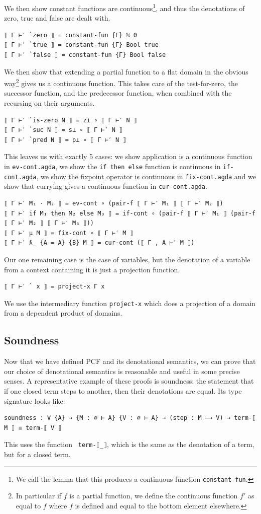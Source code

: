 \documentclass[12pt,a4paper,twoside,openright]{report}
\begin{document}
We then show constant functions are continuous\footnote{We call the lemma that this produces a continuous function \texttt{constant-fun}.}, and thus the denotations of zero, true and false are dealt with. 
\begin{verbatim}
⟦ Γ ⊢′ `zero ⟧ = constant-fun {Γ} ℕ 0
⟦ Γ ⊢′ `true ⟧ = constant-fun {Γ} Bool true
⟦ Γ ⊢′ `false ⟧ = constant-fun {Γ} Bool false
\end{verbatim}
We then show that extending a partial function to a flat domain in the obvious way\footnote{In particular if $f$ is a partial function, we define the continuous function $f'$ as equal to $f$ where $f$ is defined and equal to the bottom element elsewhere.} gives us a continuous function. This takes care of the test-for-zero, the successor function, and the predecessor function, when combined with the recursing on their arguments. 
\begin{verbatim}
⟦ Γ ⊢′ `is-zero N ⟧ = z⊥ ∘ ⟦ Γ ⊢′ N ⟧
⟦ Γ ⊢′ `suc N ⟧ = s⊥ ∘ ⟦ Γ ⊢′ N ⟧
⟦ Γ ⊢′ `pred N ⟧ = p⊥ ∘ ⟦ Γ ⊢′ N ⟧
\end{verbatim}
This leaves us with exactly 5 cases: we show application is a continuous function in \texttt{ev-cont.agda}, we show the \texttt{if then else} function is continuous in \texttt{if-cont.agda}, we show the fixpoint operator is continuous in \texttt{fix-cont.agda} and we show that currying gives a continuous function in \texttt{cur-cont.agda}.
\begin{verbatim}
⟦ Γ ⊢′ M₁ · M₂ ⟧ = ev-cont ∘ (pair-f ⟦ Γ ⊢′ M₁ ⟧ ⟦ Γ ⊢′ M₂ ⟧) 
⟦ Γ ⊢′ if M₁ then M₂ else M₃ ⟧ = if-cont ∘ (pair-f ⟦ Γ ⊢′ M₁ ⟧ (pair-f ⟦ Γ ⊢′ M₂ ⟧ ⟦ Γ ⊢′ M₃ ⟧))
⟦ Γ ⊢′ μ M ⟧ = fix-cont ∘ ⟦ Γ ⊢′ M ⟧ 
⟦ Γ ⊢′ ƛ_ {A = A} {B} M ⟧ = cur-cont (⟦ Γ , A ⊢′ M ⟧)
\end{verbatim}
Our one remaining case is the case of variables, but the denotation of a variable from a context containing it is just a projection function. 
\begin{verbatim}
⟦ Γ ⊢′ ` x ⟧ = project-x Γ x
\end{verbatim}
We use the intermediary function \texttt{project-x} which does a projection of a domain from a dependent product of domains.
\subsection{Soundness}
Now that we have defined PCF and its denotational semantics, we can prove that our choice of denotational semantics is reasonable and useful in some precise senses. A representative example of these proofs is soundness: the statement that if one 
closed term steps to another, then their denotations are equal. Its type signature looks like:
\begin{verbatim}
soundness : ∀ {A} → {M : ∅ ⊢ A} {V : ∅ ⊢ A} → (step : M —→ V) → term-⟦ M ⟧ ≡ term-⟦ V ⟧
\end{verbatim}
This uses the function \texttt{ term-⟦\_⟧}, which is the same as the denotation of a term, but for a closed term. 
\end{document}
